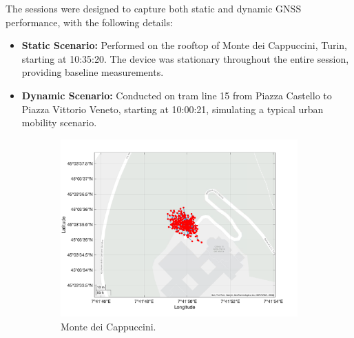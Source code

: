         \noindent The sessions were designed to capture both static and dynamic GNSS performance, with the following details:

        \begin{itemize}
            \item \textbf{Static Scenario:} Performed on the rooftop of Monte dei Cappuccini, Turin, starting at 10:35:20. The device was stationary throughout the entire session, providing baseline measurements.
            \item \textbf{Dynamic Scenario:} Conducted on tram line 15 from Piazza Castello to Piazza Vittorio Veneto, starting at 10:00:21, simulating a typical urban mobility scenario.
        \end{itemize}

        \begin{figure}[h!]
            \centering
            \begin{subfigure}{0.23\textwidth}
                \centering
                \includegraphics[width=\textwidth]{images/tests/Monte_Cappuccini/png/Samsung_A51_Monte_Cappuccini_fig6.png}
                \caption{Monte dei Cappuccini.}
                \label{fig:static_scenario}
            \end{subfigure}
            \hfill
            \begin{subfigure}{0.23\textwidth}
                \centering

\end{subfigure}
\end{figure}
